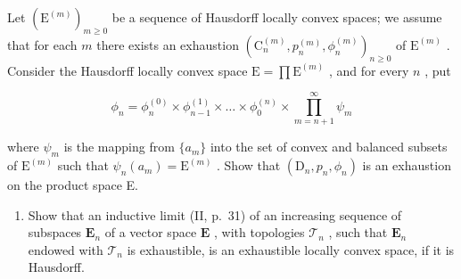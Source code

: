 Let \((\mathrm{E}^{(m)})_{m\geqslant 0}\) be a sequence of Hausdorff locally convex spaces; we assume that for each \(m\) there exists an exhaustion \((\mathrm{C}_n^{(m)},p_n^{(m)},\phi_n^{(m)})_{n\geqslant 0}\) of \(\mathrm{E}^{(m)}\) . Consider the Hausdorff locally convex space \(\mathrm{E} = \prod \mathrm{E}^{(m)}\) , and for every \(n\) , put

\[
\phi_ {n} = \phi_ {n} ^ {(0)} \times \phi_ {n - 1} ^ {(1)} \times \dots \times \phi_ {0} ^ {(n)} \times \prod_ {m = n + 1} ^ {\infty} \psi_ {m}
\]

where \(\psi_{m}\) is the mapping from \(\{a_m\}\) into the set of convex and balanced subsets of \(\mathrm{E}^{(m)}\) such that \(\psi_{n}(a_{m}) = \mathrm{E}^{(m)}\) . Show that \((\mathrm{D}_n,p_n,\phi_n)\) is an exhaustion on the product space E.

\begin{enumerate}
\def\labelenumi{\arabic{enumi})}
\setcounter{enumi}{5}
\tightlist
\item
  Show that an inductive limit (II, p.~31) of an increasing sequence of subspaces \(\mathbf{E}_n\) of a vector space \(\mathbf{E}\) , with topologies \(\mathcal{T}_n\) , such that \(\mathbf{E}_n\) endowed with \(\mathcal{T}_n\) is exhaustible, is an exhaustible locally convex space, if it is Hausdorff.
\end{enumerate}

